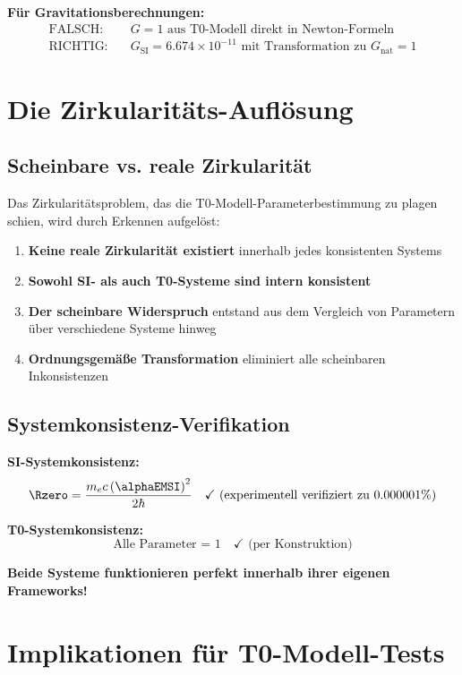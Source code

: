	\textbf{Für Gravitationsberechnungen:}
	\begin{align}
		\text{FALSCH:} \quad &G = 1 \text{ aus T0-Modell direkt in Newton-Formeln} \\
		\text{RICHTIG:} \quad &G_{\text{SI}} = 6.674 \times 10^{-11} \text{ mit Transformation zu } G_{\text{nat}} = 1
	\end{align}
	
	\section{Die Zirkularitäts-Auflösung}
	\label{sec:zirkularitaets_aufloesung}
	
	\subsection{Scheinbare vs. reale Zirkularität}
	\label{subsec:scheinbare_reale_zirkularitaet}
	
	Das Zirkularitätsproblem, das die T0-Modell-Parameterbestimmung zu plagen schien, wird durch Erkennen aufgelöst:
	
	\begin{enumerate}
		\item \textbf{Keine reale Zirkularität existiert} innerhalb jedes konsistenten Systems
		\item \textbf{Sowohl SI- als auch T0-Systeme sind intern konsistent}
		\item \textbf{Der scheinbare Widerspruch} entstand aus dem Vergleich von Parametern über verschiedene Systeme hinweg
		\item \textbf{Ordnungsgemäße Transformation} eliminiert alle scheinbaren Inkonsistenzen
	\end{enumerate}
	
	\subsection{Systemkonsistenz-Verifikation}
	\label{subsec:systemkonsistenz}
	
	\textbf{SI-Systemkonsistenz:}
	$$\Rzero = \frac{m_e c \left(\alphaEMSI\right)^2}{2\hbar} \quad \checkmark \text{ (experimentell verifiziert zu 0.000001\%)}$$
	
	\textbf{T0-Systemkonsistenz:}
	$$\text{Alle Parameter = 1} \quad \checkmark \text{ (per Konstruktion)}$$
	
	\textbf{Beide Systeme funktionieren perfekt innerhalb ihrer eigenen Frameworks!}
	
	\section{Implikationen für T0-Modell-Tests}
	\label{sec:test_implikationen}
	

